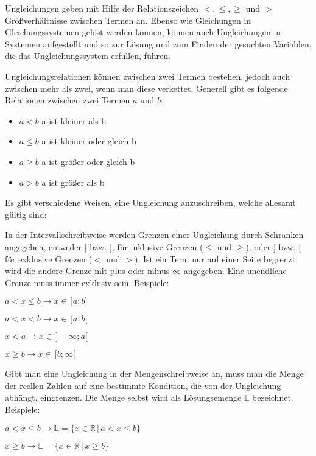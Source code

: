 



\thispagestyle{plain}


Ungleichungen geben mit Hilfe der Relationszeichen $<, \leq, \geq$ und $>$ Gr\"{o}\ss{}verh\"{a}ltnisse zwischen Termen an. Ebenso wie Gleichungen in Gleichungssystemen gel\"{o}st werden k\"{o}nnen, k\"{o}nnen auch Ungleichungen in Systemen aufgestellt und so zur L\"{o}sung und zum Finden der gesuchten Variablen, die das Ungleichungssystem erf\"{u}llen, f\"{u}hren.


Ungleichungsrelationen k\"{o}nnen zwischen zwei Termen bestehen, jedoch auch zwischen mehr als zwei, wenn man diese verkettet. Generell gibt es folgende Relationen zwischen zwei Termen $a$ und $b$:
\begin{itemize}
	\item $a < b$  a ist kleiner als b
	\item $a \leq b$  a ist kleiner oder gleich b
	\item $a \geq b$  a ist gr\"{o}\ss{}er oder gleich b
	\item $a > b$  a ist gr\"{o}\ss{}er als b
\end{itemize}


Es gibt verschiedene Weisen, eine Ungleichung anzuschreiben, welche allesamt g\"{u}ltig sind:


In der Intervallschreibweise werden Grenzen einer Ungleichung durch Schranken angegeben, entweder $[$ bzw. $]$, f\"{u}r inklusive Grenzen ($\leq$ und $\geq$), oder $]$ bzw. $[$ f\"{u}r exklusive Grenzen ($<$ und $>$). Ist ein Term nur auf einer Seite begrenzt, wird die andere Grenze mit plus oder minus $\infty$ angegeben. Eine unendliche Grenze muss immer exklusiv sein. Beispiele:
\begin{center}
	$a < x \leq b \rightarrow x \in \,]a;b]$

	$a < x < b \rightarrow x \in \,]a;b[$

	$x < a \rightarrow x \in \,]-\infty;a[$

	$x \geq b \rightarrow x \in \,[b;\infty[$
\end{center}


Gibt man eine Ungleichung in der Mengenschreibweise an, muss man die Menge der reellen Zahlen auf eine bestimmte Kondition, die von der Ungleichung abh\"{a}ngt, eingrenzen. Die Menge selbst wird als L\"{o}sungsemenge $\mathbb{L}$ bezeichnet. Beispiele:
\begin{center}
	$a < x \leq b \rightarrow \mathbb{L} = \{x \in \mathbb{R}\,|\,a < x \leq b\}$

	$x \geq b \rightarrow \mathbb{L} = \{x \in \mathbb{R}\,|\,x \geq b \}$
\end{center}

